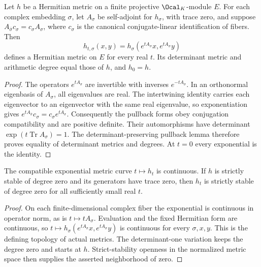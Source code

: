 \begin{lemma}
\label{lem:arithmetic-exponential-variation}
\leanok
Let $h$ be a Hermitian metric on a finite projective $\Ocal_K$-module $E$.
For each complex embedding $\sigma$, let $A_\sigma$ be self-adjoint for
$h_\sigma$, with trace zero, and suppose
$A_{\bar\sigma}c_\sigma=c_\sigma A_\sigma$, where $c_\sigma$ is the
canonical conjugate-linear identification of fibers. Then
\[
 h_{t,\sigma}(x,y)=h_\sigma(e^{tA_\sigma}x,e^{tA_\sigma}y)
\]
defines a Hermitian metric on $E$ for every real $t$. Its determinant
metric and arithmetic degree equal those of $h$, and $h_0=h$.
\end{lemma}
\begin{proof}
The operators $e^{tA_\sigma}$ are invertible with inverses
$e^{-tA_\sigma}$. In an orthonormal eigenbasis of $A_\sigma$, all
eigenvalues are real. The intertwining identity carries each eigenvector
to an eigenvector with the same real eigenvalue, so exponentiation gives
$e^{tA_{\bar\sigma}}c_\sigma=c_\sigma e^{tA_\sigma}$.
Consequently the pullback forms obey conjugation compatibility and are
positive definite. Their automorphisms have determinant
$\exp(t\operatorname{Tr} A_\sigma)=1$. The determinant-preserving
pullback lemma therefore proves equality of determinant metrics and
degrees. At $t=0$ every exponential is the identity.
\end{proof}

\begin{lemma}
\label{lem:exponential-stability-neighborhood}
\leanok
The compatible exponential metric curve $t\mapsto h_t$ is continuous.
If $h$ is strictly stable of degree zero and its generators have trace
zero, then $h_t$ is strictly stable of degree zero for all sufficiently
small real $t$.
\end{lemma}
\begin{proof}
On each finite-dimensional complex fiber the exponential is continuous
in operator norm, as is $t\mapsto tA_\sigma$. Evaluation and the fixed
Hermitian form are continuous, so
$t\mapsto h_\sigma(e^{tA_\sigma}x,e^{tA_\sigma}y)$ is continuous
for every $\sigma,x,y$. This is the defining topology of actual metrics.
The determinant-one variation keeps the degree zero and starts at $h$.
Strict-stability openness in the normalized metric space then supplies
the asserted neighborhood of zero.
\end{proof}

